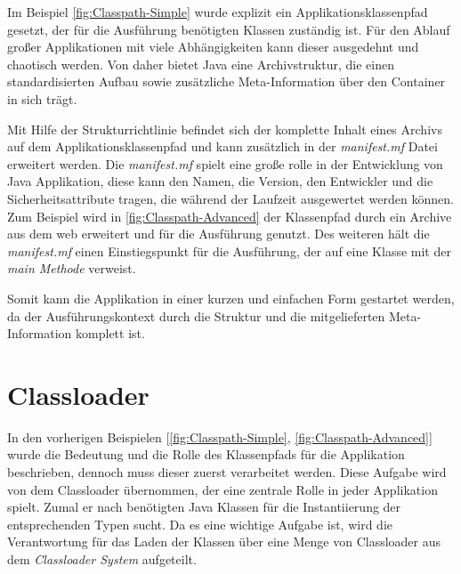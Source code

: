   Im Beispiel \ref{fig:Classpath-Simple} wurde explizit ein Applikationsklassenpfad gesetzt, der für die Ausführung benötigten Klassen zuständig ist. Für den Ablauf großer Applikationen mit viele Abhängigkeiten kann dieser ausgedehnt und chaotisch werden. Von daher bietet Java eine Archivstruktur, die einen standardisierten Aufbau sowie zusätzliche Meta-Information über den Container in sich trägt. 
  
  Mit Hilfe der Strukturrichtlinie befindet sich der komplette Inhalt eines Archivs auf dem Applikationsklassenpfad und kann zusätzlich in der \textit{manifest.mf} Datei erweitert werden. Die \textit{manifest.mf} spielt eine große rolle in der Entwicklung von Java Applikation, diese kann den Namen, die Version, den Entwickler und die Sicherheitsattribute tragen, die während der Laufzeit ausgewertet werden können. Zum Beispiel wird in \ref{fig:Classpath-Advanced} der Klassenpfad durch ein Archive aus dem web erweitert und für die Ausführung genutzt. Des weiteren hält die \textit{manifest.mf} einen Einstiegspunkt für die Ausführung, der auf eine Klasse mit der \textit{main Methode} verweist.
  
  Somit kann die Applikation in einer kurzen und einfachen Form gestartet werden, da der Ausführungskontext durch die Struktur und die mitgelieferten Meta-Information komplett ist.

\section{Classloader}\label{sub:classloader}
  In den vorherigen Beispielen [\ref{fig:Classpath-Simple}, \ref{fig:Classpath-Advanced}] wurde die Bedeutung und die Rolle des Klassenpfads für die Applikation beschrieben, dennoch muss dieser zuerst verarbeitet werden. Diese Aufgabe wird von dem Classloader übernommen, der eine zentrale Rolle in jeder Applikation spielt. Zumal er nach benötigten Java Klassen für die Instantiierung der entsprechenden Typen sucht. Da es eine wichtige Aufgabe ist, wird die Verantwortung für das Laden der Klassen über eine Menge von Classloader aus dem \textit{Classloader System} aufgeteilt. 

